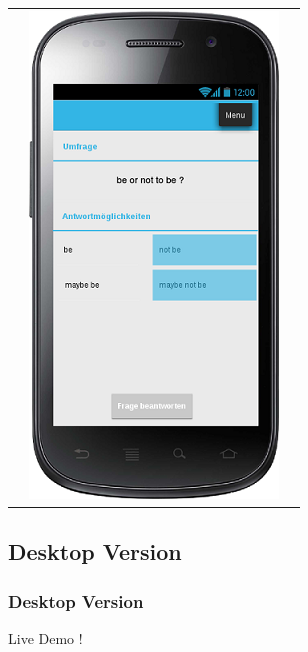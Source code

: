 \documentclass[german,a4paper]{beamer}
\begin{document}
\begin{frame}
\begin{tabular}{ccc}
  &
  \includegraphics[height=0.75\textheight]{./mockups/mockup_survey_answer.png}
\end{tabular}
\end{frame}

\subsection{Desktop Version}
\begin{frame}
\frametitle{Desktop Version}
 Live Demo !
\end{frame}
\end{document}
